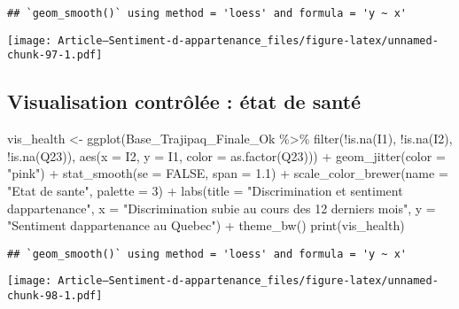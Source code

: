\documentclass[
]{article}
\newenvironment{Shaded}{\begin{snugshade}}{\end{snugshade}}
\newcommand{\AttributeTok}[1]{\textcolor[rgb]{0.77,0.63,0.00}{#1}}
\newcommand{\ConstantTok}[1]{\textcolor[rgb]{0.00,0.00,0.00}{#1}}
\newcommand{\DecValTok}[1]{\textcolor[rgb]{0.00,0.00,0.81}{#1}}
\newcommand{\FloatTok}[1]{\textcolor[rgb]{0.00,0.00,0.81}{#1}}
\newcommand{\FunctionTok}[1]{\textcolor[rgb]{0.00,0.00,0.00}{#1}}
\newcommand{\NormalTok}[1]{#1}
\newcommand{\OtherTok}[1]{\textcolor[rgb]{0.56,0.35,0.01}{#1}}
\newcommand{\SpecialCharTok}[1]{\textcolor[rgb]{0.00,0.00,0.00}{#1}}
\newcommand{\StringTok}[1]{\textcolor[rgb]{0.31,0.60,0.02}{#1}}
\begin{document}
\begin{verbatim}
## `geom_smooth()` using method = 'loess' and formula = 'y ~ x'
\end{verbatim}

\texttt{[image: Article---Sentiment-d-appartenance\_files/figure-latex/unnamed-chunk-97-1.pdf]}

\hypertarget{visualisation-contruxf4luxe9e-uxe9tat-de-santuxe9}{%
\subsection{Visualisation contrôlée : état de
santé}\label{visualisation-contruxf4luxe9e-uxe9tat-de-santuxe9}}

\begin{Shaded}
\begin{Highlighting}[]
\NormalTok{vis\_health }\OtherTok{\textless{}{-}} \FunctionTok{ggplot}\NormalTok{(Base\_Trajipaq\_Finale\_Ok }\SpecialCharTok{\%\textgreater{}\%}
                \FunctionTok{filter}\NormalTok{(}\SpecialCharTok{!}\FunctionTok{is.na}\NormalTok{(I1), }\SpecialCharTok{!}\FunctionTok{is.na}\NormalTok{(I2), }\SpecialCharTok{!}\FunctionTok{is.na}\NormalTok{(Q23)), }\FunctionTok{aes}\NormalTok{(}\AttributeTok{x =}\NormalTok{ I2, }\AttributeTok{y =}\NormalTok{ I1, }\AttributeTok{color =} \FunctionTok{as.factor}\NormalTok{(Q23))) }\SpecialCharTok{+}
  \FunctionTok{geom\_jitter}\NormalTok{(}\AttributeTok{color =} \StringTok{"pink"}\NormalTok{) }\SpecialCharTok{+}
  \FunctionTok{stat\_smooth}\NormalTok{(}\AttributeTok{se =} \ConstantTok{FALSE}\NormalTok{, }\AttributeTok{span =} \FloatTok{1.1}\NormalTok{) }\SpecialCharTok{+}
  \FunctionTok{scale\_color\_brewer}\NormalTok{(}\AttributeTok{name =} \StringTok{"Etat de sante"}\NormalTok{, }\AttributeTok{palette =} \DecValTok{3}\NormalTok{) }\SpecialCharTok{+}
  \FunctionTok{labs}\NormalTok{(}\AttributeTok{title =} \StringTok{"Discrimination et sentiment d\textquotesingle{}appartenance"}\NormalTok{, }
       \AttributeTok{x =} \StringTok{"Discrimination subie au cours des 12 derniers mois"}\NormalTok{, }
       \AttributeTok{y =} \StringTok{"Sentiment d\textquotesingle{}appartenance au Quebec"}\NormalTok{) }\SpecialCharTok{+}
  \FunctionTok{theme\_bw}\NormalTok{()}
\FunctionTok{print}\NormalTok{(vis\_health)}
\end{Highlighting}
\end{Shaded}

\begin{verbatim}
## `geom_smooth()` using method = 'loess' and formula = 'y ~ x'
\end{verbatim}

\texttt{[image: Article---Sentiment-d-appartenance\_files/figure-latex/unnamed-chunk-98-1.pdf]}
\end{document}
